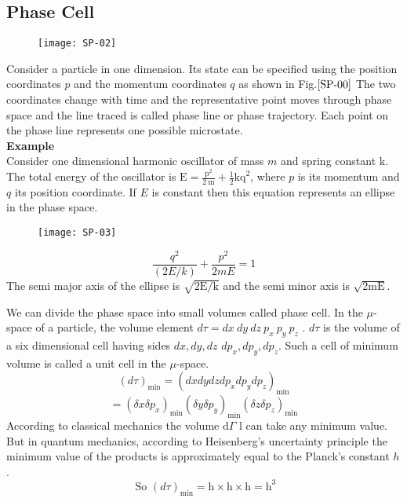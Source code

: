 \subsection{Phase Cell}
\begin{figure}[H]
	\centering
	\texttt{[image: SP-02]}
	\caption{}
	\label{SP-00}
\end{figure}
\par Consider a particle in one dimension. Its state can be specified using the position coordinates $p$ and the momentum coordinates $q$ as shown in Fig.$\ref{SP-00}$ The two coordinates change with time and the representative point moves through phase space and the line traced is called phase line or phase trajectory. Each point on the phase line represents one possible microstate.\\
\textbf{Example}\\
Consider one dimensional harmonic oscillator of mass $m$ and spring constant $\mathrm{k}$. The total energy of the oscillator is $\mathrm{E}=\frac{\mathrm{p}^{2}}{2 \mathrm{~m}}+\frac{1}{2} \mathrm{kq}^{2}$, where $p$ is its momentum and $q$ its position coordinate. If $E$ is constant then this equation represents an ellipse in the phase space.
\begin{figure}[H]
	\centering
	\texttt{[image: SP-03]}
\end{figure}
$$\frac{q^{2}}{(2 E / k)}+\frac{p^{2}}{2 m E}=1$$
The semi major axis of the ellipse is $\sqrt{2 \mathrm{E} / \mathrm{k}}$ and the semi minor axis is $\sqrt{2 \mathrm{mE}}$.\\
\par We can divide the phase space into small volumes called phase cell. In the $\mu$-space of a particle, the volume element $d \tau=d x\  d y \ d z\  p_{x}\  p_y \ p_z$ . $d\tau$  is the volume of a six dimensional cell having sides ${d x, d y, d z}$ $d p_{x}, d p_{y}, d p_{z}$. Such a cell of minimum volume is called a unit cell in the $\mu$-space.
$$(d \tau)_{\min }=\left(d x d y d z d p_{x} d p_{y} d p_{z}\right)_{\min }$$
$$=\left(\delta x \delta p_{x}\right)_{\min }\left(\delta y \delta p_{y}\right)_{\min }\left(\delta z \delta p_{z}\right)_{\min }$$
According to classical mechanics the volume d$\Gamma$
l can take any minimum value. But in quantum mechanics, according to Heisenberg's uncertainty principle the minimum value of the products is approximately equal to the Planck's constant $h$.\\
$$\text{ So }(d \tau)_{\min }=\mathrm{h} \times \mathrm{h} \times \mathrm{h}=\mathrm{h}^{3}$$

